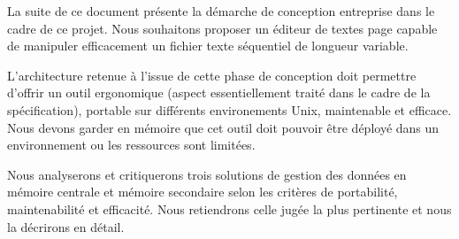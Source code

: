 La suite de ce document présente la démarche de conception entreprise dans le
cadre de ce projet. Nous souhaitons proposer un éditeur de textes page capable
de manipuler efficacement un fichier texte séquentiel de longueur variable.

L'architecture retenue à l'issue de cette phase de conception doit permettre
d'offrir un outil ergonomique (aspect essentiellement traité dans le cadre de
la spécification), portable sur différents environements Unix, maintenable et
efficace. Nous devons garder en mémoire que cet outil doit pouvoir être déployé
dans un environnement ou les ressources sont limitées.

Nous analyserons et critiquerons trois solutions de gestion des données en
mémoire centrale et mémoire secondaire selon les critères de portabilité,
maintenabilité et efficacité. Nous retiendrons celle jugée la plus pertinente
et nous la décrirons en détail.

